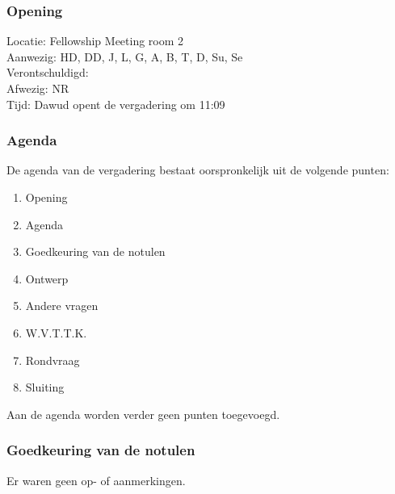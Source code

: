 \subsubsection{Opening}
Locatie: Fellowship Meeting room 2\\
Aanwezig: HD, DD, J, L, G, A, B, T, D, Su, Se\\
Verontschuldigd: \\
Afwezig: NR \\
Tijd: Dawud opent de vergadering om 11:09\\

\subsubsection{Agenda}
De agenda van de vergadering bestaat oorspronkelijk uit de volgende punten:
\begin{enumerate}
\item Opening
\item Agenda
\item Goedkeuring van de notulen
\item Ontwerp
\item Andere vragen
\item W.V.T.T.K.
\item Rondvraag
\item Sluiting
\end{enumerate}

Aan de agenda worden verder geen punten toegevoegd.

\subsubsection{Goedkeuring van de notulen}
Er waren geen op- of aanmerkingen.

